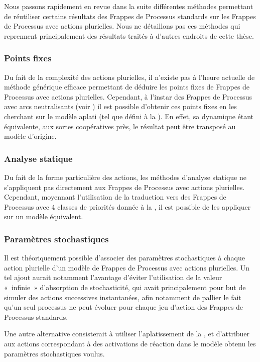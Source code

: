 

Nous passons rapidement en revue dans la suite différentes méthodes permettant de réutiliser
certains résultats des Frappes de Processus standards sur les Frappes de Processus avec
actions plurielles.
Nous ne détaillons pas ces méthodes qui reprennent principalement des résultats
traités à d'autres endroits de cette thèse.

\subsubsection{Points fixes}

Du fait de la complexité des actions plurielles, il n'existe pas à l'heure actuelle de méthode
générique efficace permettant de déduire les points fixes de Frappes de Processus avec
actions plurielles.
Cependant, à l'instar des Frappes de Processus avec arcs neutralisants
(voir )
il est possible d'obtenir ces points fixes en les cherchant sur
le modèle aplati (tel que défini à la ).
En effet, sa dynamique étant équivalente, aux sortes coopératives près, le résultat
peut être transposé au modèle d'origine.

\subsubsection{Analyse statique}

Du fait de la forme particulière des actions, les méthodes d'analyse statique ne s'appliquent pas
directement aux Frappes de Processus avec actions plurielles.
Cependant, moyennant l'utilisation de la traduction vers des Frappes de Processus
avec 4 classes de priorités donnée à la ,
il est possible de les appliquer sur un modèle équivalent.

\subsubsection{Paramètres stochastiques}

Il est théoriquement possible d'associer des paramètres stochastiques à chaque action plurielle
d'un modèle de Frappes de Processus avec actions plurielles.
Un tel ajout aurait notamment l'avantage d'éviter l'utilisation de la valeur «~infinie~»
d'absorption de stochasticité, qui avait principalement pour but de simuler des actions
successives instantanées, afin notamment de pallier le fait qu'un seul processus
ne peut évoluer pour chaque jeu d'action des Frappes de Processus standards.

Une autre alternative consisterait à utiliser l'aplatissement de la ,
et d'attribuer aux actions correspondant à des activations de réaction
dans le modèle obtenu les paramètres stochastiques voulus.
